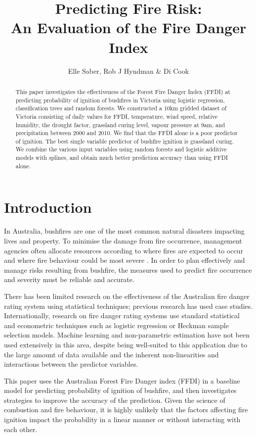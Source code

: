 \documentclass[11pt,a4paper]{article}
\title{Predicting Fire Risk: \\ An Evaluation of the Fire Danger Index}
\author{Elle Saber, Rob J Hyndman \& Di Cook}
\begin{document}
\maketitle

\begin{abstract}
  This paper investigates the effectiveness of the Forest Fire Danger Index (FFDI) \citep{mcarthur67} at predicting probability of ignition of bushfires in Victoria using logistic regression, classification trees and random forests. We constructed a 10km gridded dataset of Victoria consisting of daily values for FFDI, temperature, wind speed, relative humidity, the drought factor, grassland curing level, vapour pressure at 9am, and precipitation between 2000 and 2010. We find that the FFDI alone is a poor predictor of ignition. The best single variable predictor of bushfire ignition is grassland curing. We combine the various input variables using random forests and logistic additive models with splines, and obtain much better prediction accuracy than using FFDI alone.
\end{abstract}

\section{Introduction}

In Australia, bushfires are one of the most common natural disasters impacting lives and property. To minimise the damage from fire occurrence, management agencies often allocate resources according to where fires are expected to occur and where fire behaviour could be most severe  \citep{padilla11, wotton05}. In order to plan effectively and manage risks resulting from bushfire, the measures used to predict fire occurrence and severity must be reliable and accurate.

There has been limited research on the effectiveness of the Australian fire danger rating system using statistical techniques; previous research has used case studies. Internationally, research on fire danger rating systems use standard statistical and econometric techniques such as logistic regression or Heckman sample selection models. Machine learning and non-parametric estimation have not been used extensively in this area, despite being well-suited to this application due to the large amount of data available and the inherent non-linearities and interactions between the predictor variables.

This paper uses the Australian Forest Fire Danger index (FFDI) in a baseline model for predicting probability of ignition of bushfire, and then investigates strategies to improve the accuracy of the prediction. Given the science of combustion and fire behaviour, it is highly unlikely that the factors affecting fire ignition impact the probability in a linear manner or without interacting with each other.
\end{document}
